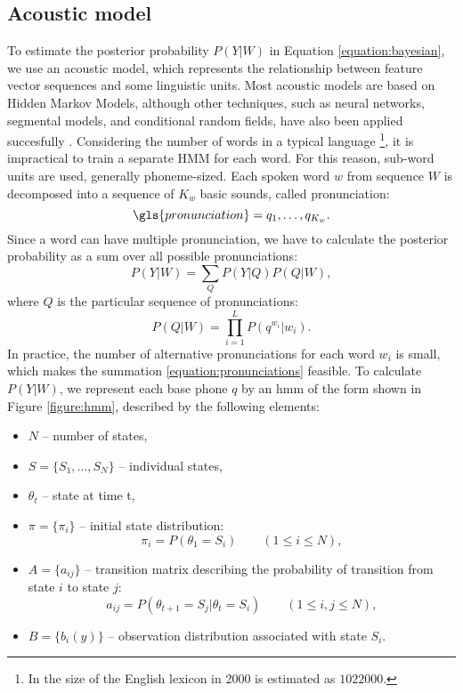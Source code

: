 \subsection{Acoustic model}
\label{subsection:acoustic}
To estimate the posterior probability $P(Y|W)$ in Equation \ref{equation:bayesian}, we use an acoustic model, which represents the relationship between feature vector sequences and some linguistic units. Most acoustic models are based on Hidden Markov Models, although other techniques, such as neural networks, segmental models, and conditional random fields, have also been applied succesfully \cite{yu2009hidden, yu2008maximum, mohamed2012acoustic}. Considering the number of words in a typical language \footnote{In \cite{michel2011quantitative} the size of the English lexicon in 2000 is estimated as $1022000$.}, it is impractical to train a separate HMM for each word. For this reason, sub-word units are used, generally phoneme-sized. Each spoken word $w$ from sequence $W$ is decomposed into a sequence of $K_{w}$ basic sounds, called pronunciation:
\begin{equation}
  \gls{pronunciation}=q_{1}, \ldots, q_{K_{w}}.
\end{equation}
Since a word can have multiple pronunciation, we have to calculate the posterior probability as a sum over all possible pronunciations:
\begin{equation}
  \label{equation:pronunciations}
  P(Y|W) = \sum_{Q}P(Y|Q)P(Q|W),
\end{equation}
where $Q$ is the particular sequence of pronunciations:
\begin{equation}
  P(Q|W)=\prod_{i=1}^{L}P(q^{w_{i}}|w_{i}).
\end{equation}
In practice, the number of alternative pronunciations for each word $w_{i}$ is small, which makes the summation \ref{equation:pronunciations} feasible. To calculate $P(Y|W)$, we represent each base phone $q$ by an \gls{hmm} of the form shown in Figure \ref{figure:hmm}, described by the following elements:
\begin{itemize}
\item $N$ -- number of states,
\item $S=\{S_{1}, \ldots, S_{N}\}$ -- individual states,
\item $\theta_{t}$ -- state at time t,
\item $\pi=\{\pi_{i}\}$ -- initial state distribution:
  \begin{equation*}
    \pi_{i}=P(\theta_{1}=S_{i}) \qquad (1 \leqslant i \leqslant N),
  \end{equation*}
\item $A=\{a_{ij}\}$ -- transition matrix describing the probability of transition from state $i$ to state $j$:
  \begin{equation*}
    a_{ij}=P(\theta_{t+1}=S_{j}|\theta_{t}=S_{i}) \qquad (1 \leqslant i, j \leqslant N), 
  \end{equation*}
\item $B=\{b_{i}(y)\}$ -- observation distribution associated with state $S_{i}$.
\end{itemize}
